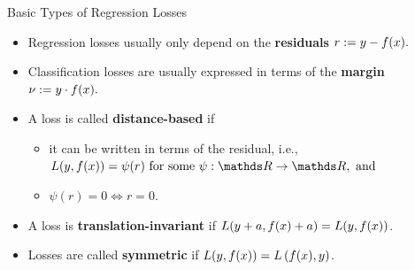 
\begin{vbframe}{Basic Types of Regression Losses}


\begin{itemize}
  \small
  \item Regression losses usually only depend on the \textbf{residuals}
  $r := y - f(x).$
  \item Classification losses are usually expressed in terms of the 
  \textbf{margin} $\nu := y \cdot f(x).$
  \item A loss is called \textbf{distance-based} if
  \begin{itemize}
    \small
    \item it can be written in terms of the residual, i.e., 
    $\Lxy = \psi (r) \text{ for some } \psi: \R \to \R, ~ \text{and}$
    \item $\psi(r) = 0 \Leftrightarrow r = 0$.
  \end{itemize}
  \item A loss is \textbf{translation-invariant} if $L(y + a, f(x) + a) = L(y, f(x))$.
  \item Losses are called \textbf{symmetric} if $L(y, f(x)) = L\left(f(x), y\right)$. 
\end{itemize}

\vfill


\end{vbframe}
